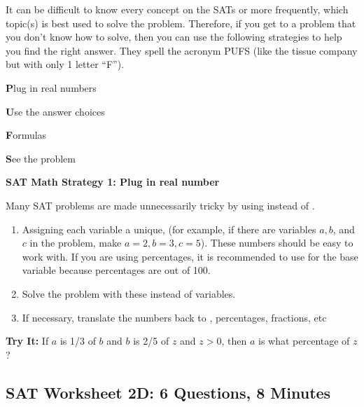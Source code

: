 \documentclass[12pt]{book}
\newcommand{\longline}{\underline{\hspace{2in}} }
\begin{document}
It can be difficult to know every concept on the SATs or more frequently, which topic(s) is best used to solve the problem. Therefore, if you get to a problem that you don't know how to solve, then you can use the following strategies to help you find the right answer. They spell the acronym PUFS (like the tissue company but with only 1 letter ``F'').

\bigskip
\textbf{\large P}lug in real numbers

\medskip
\textbf{\large U}se the answer choices

\medskip
\textbf{\large F}ormulas

\medskip
\textbf{\large S}ee the problem

\hrulefill

\textbf{SAT Math Strategy 1: Plug in real number}

\bigskip
Many SAT problems are made unnecessarily tricky by using \longline instead of \longline.

\begin{enumerate}
\item Assigning each variable a unique, \longline (for example, if there are variables $a, b$, and $c$ in the problem, make $a=2, b=3, c=5$). These numbers should be easy to work with. If you are using percentages, it is recommended to use \longline for the base variable because percentages are out of 100.
\item Solve the problem with these \longline instead of variables.
\item If necessary, translate the numbers back to \longline, percentages, fractions, etc
\end{enumerate}

\textbf{Try It:} If $a$ is 1/3 of $b$ and $b$ is 2/5 of $z$ and $z>0$, then $a$ is what percentage of $z$?

\pagebreak
\subsection{SAT Worksheet 2D: 6 Questions, 8 Minutes}
\end{document}
